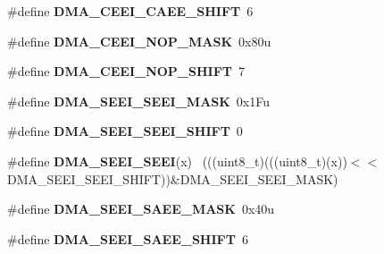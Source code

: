 \begin{DoxyCompactItemize}
\item 
\hypertarget{group___d_m_a___register___masks_ga389695175eaab975f78ed66669e467df}{}\#define {\bfseries D\+M\+A\+\_\+\+C\+E\+E\+I\+\_\+\+C\+A\+E\+E\+\_\+\+S\+H\+I\+F\+T}~6\label{group___d_m_a___register___masks_ga389695175eaab975f78ed66669e467df}

\item 
\hypertarget{group___d_m_a___register___masks_ga5b85e28933ce4120f8a8542972b92115}{}\#define {\bfseries D\+M\+A\+\_\+\+C\+E\+E\+I\+\_\+\+N\+O\+P\+\_\+\+M\+A\+S\+K}~0x80u\label{group___d_m_a___register___masks_ga5b85e28933ce4120f8a8542972b92115}

\item 
\hypertarget{group___d_m_a___register___masks_gaa6681149d6d175500734c3ae71842eba}{}\#define {\bfseries D\+M\+A\+\_\+\+C\+E\+E\+I\+\_\+\+N\+O\+P\+\_\+\+S\+H\+I\+F\+T}~7\label{group___d_m_a___register___masks_gaa6681149d6d175500734c3ae71842eba}

\item 
\hypertarget{group___d_m_a___register___masks_ga67059eac1eff574cd4934a35a0476015}{}\#define {\bfseries D\+M\+A\+\_\+\+S\+E\+E\+I\+\_\+\+S\+E\+E\+I\+\_\+\+M\+A\+S\+K}~0x1\+Fu\label{group___d_m_a___register___masks_ga67059eac1eff574cd4934a35a0476015}

\item 
\hypertarget{group___d_m_a___register___masks_ga8d58d06faafb79d99b17b5694f3d18e5}{}\#define {\bfseries D\+M\+A\+\_\+\+S\+E\+E\+I\+\_\+\+S\+E\+E\+I\+\_\+\+S\+H\+I\+F\+T}~0\label{group___d_m_a___register___masks_ga8d58d06faafb79d99b17b5694f3d18e5}

\item 
\hypertarget{group___d_m_a___register___masks_ga8314bbf831906b324b2146cbe7b1bc02}{}\#define {\bfseries D\+M\+A\+\_\+\+S\+E\+E\+I\+\_\+\+S\+E\+E\+I}(x)                                              ~(((uint8\+\_\+t)(((uint8\+\_\+t)(x))$<$$<$D\+M\+A\+\_\+\+S\+E\+E\+I\+\_\+\+S\+E\+E\+I\+\_\+\+S\+H\+I\+F\+T))\&D\+M\+A\+\_\+\+S\+E\+E\+I\+\_\+\+S\+E\+E\+I\+\_\+\+M\+A\+S\+K)\label{group___d_m_a___register___masks_ga8314bbf831906b324b2146cbe7b1bc02}

\item 
\hypertarget{group___d_m_a___register___masks_ga2d0a03f5b7e54876cc8a0af2251b1809}{}\#define {\bfseries D\+M\+A\+\_\+\+S\+E\+E\+I\+\_\+\+S\+A\+E\+E\+\_\+\+M\+A\+S\+K}~0x40u\label{group___d_m_a___register___masks_ga2d0a03f5b7e54876cc8a0af2251b1809}

\item 
\hypertarget{group___d_m_a___register___masks_ga313d9b0f41aebf4cc2f6a5f1f730665b}{}\#define {\bfseries D\+M\+A\+\_\+\+S\+E\+E\+I\+\_\+\+S\+A\+E\+E\+\_\+\+S\+H\+I\+F\+T}~6\label{group___d_m_a___register___masks_ga313d9b0f41aebf4cc2f6a5f1f730665b}


\end{DoxyCompactItemize}
